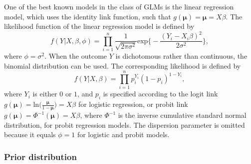 \documentclass[review, 3p, authoryear]{elsarticle} %
\begin{document}
One of the best known models in the class of GLMs is the linear regression model, which uses the identity link function, such that \(g(\boldsymbol{\mu}) = \boldsymbol{\mu} = X\beta\).
The likelihood function of the linear regression model is defined by
\[
f(Y | X, \beta, \phi) = \prod^n_{i=1} \frac{1}{\sqrt{2\pi\sigma^2}} \text{exp}
\Bigg\{
- \frac{(Y_i - X_i\beta)^2}{2\sigma^2}
\Bigg\},
\]
where \(\phi = \sigma^2\).
When the outcome \(Y\) is dichotomous rather than continuous, the binomial distribution can be used.
The corresponding likelihood is defined by
\[
f(Y|X, \beta) = \prod^n_{i=1} p_i^{Y_i} (1 - p_i)^{1 - Y_i},
\]
where \(Y_i\) is either \(0\) or \(1\), and \(p_i\) is specified according to the logit link \(g(\boldsymbol{\mu}) = \text{ln}\Big(\frac{\boldsymbol{\mu}}{1 - \boldsymbol{\mu}}\Big) = X\beta\) for logistic regression, or probit link \(g(\boldsymbol{\mu}) = \Phi^{-1}(\boldsymbol{\mu}) = X\beta\), where \(\Phi^{-1}\) is the inverse cumulative standard normal distribution, for probit regression models.
The dispersion parameter is omitted because it equals \(\phi = 1\) for logistic and probit models.

\hypertarget{prior-distribution}{%
\subsubsection{Prior distribution}\label{prior-distribution}}
\end{document}
